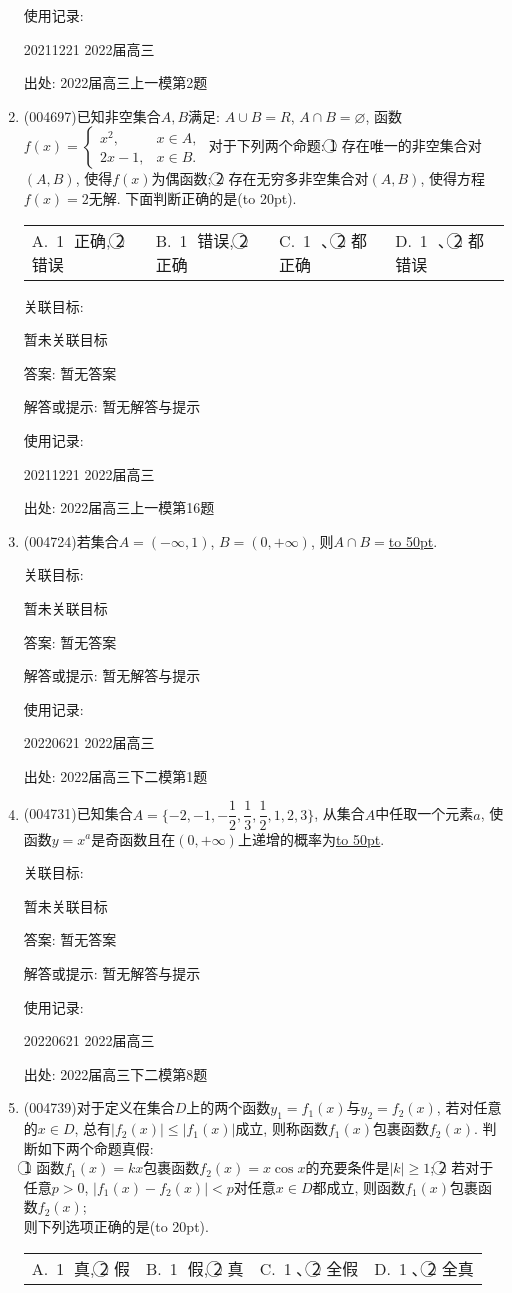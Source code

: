 \documentclass[10pt,a4paper]{article}
\newcommand{\blank}[1]{\underline{\hbox to #1pt{}}}
\newcommand{\bracket}[1]{(\hbox to #1pt{})}
\newcommand{\fourch}[4]{\par\begin{tabular}{p{.23\textwidth}p{.23\textwidth}p{.23\textwidth}p{.23\textwidth}}
A.~#1 &B.~#2& C.~#3& D.~#4
\end{tabular}}
\begin{document}
\begin{enumerate}[1.]
使用记录:

20211221	2022届高三	


出处: 2022届高三上一模第2题
\item { (004697)}已知非空集合$A,B$满足: $A\cup B=R$, $A\cap B=\varnothing$, 函数$f(x)=\begin{cases}
x^2, &  x\in A,  \\ 2x-1, &  x\in B.  \end{cases}$ 对于下列两个命题: \textcircled{1} 存在唯一的非空集合对$(A,B)$, 使得$f(x)$为偶函数; \textcircled{2} 存在无穷多非空集合对$(A,B)$, 使得方程$f(x)=2$无解. 下面判断正确的是\bracket{20}.
\fourch{\textcircled{1} 正确, \textcircled{2} 错误}{\textcircled{1} 错误, \textcircled{2} 正确}{\textcircled{1} 、\textcircled{2} 都正确}{\textcircled{1} 、\textcircled{2} 都错误}


关联目标:

暂未关联目标

答案: 暂无答案

解答或提示: 暂无解答与提示

使用记录:

20211221	2022届高三	


出处: 2022届高三上一模第16题
\item { (004724)}若集合$A=(-\infty ,1)$, $B=(0,+\infty)$, 则$A\cap B=$\blank{50}.


关联目标:

暂未关联目标

答案: 暂无答案

解答或提示: 暂无解答与提示

使用记录:

20220621	2022届高三	


出处: 2022届高三下二模第1题
\item { (004731)}已知集合$A=\{-2,-1,-\dfrac 12,\dfrac 13,\dfrac 12,1,2,3\}$, 从集合$A$中任取一个元素$a$, 使函数$y=x^a$是奇函数且在$(0,+\infty)$上递增的概率为\blank{50}.


关联目标:

暂未关联目标

答案: 暂无答案

解答或提示: 暂无解答与提示

使用记录:

20220621	2022届高三	


出处: 2022届高三下二模第8题
\item { (004739)}对于定义在集合$D$上的两个函数$y_1=f_1(x)$与$y_2=f_2(x)$, 若对任意的$x\in D$, 总有$|f_2(x)|\le |f_1(x)|$成立, 则称函数$f_1(x)$包裹函数$f_2(x)$. 判断如下两个命题真假:\\
\textcircled{1}  函数$f_1(x)=kx$包裹函数$f_2(x)=x\cos x$的充要条件是$|k|\ge 1$;
\textcircled{2}  若对于任意$p>0$, $|f_1(x)-f_2(x)|<p$对任意$x\in D$都成立, 则函数$f_1(x)$包裹函数$f_2(x)$;\\
则下列选项正确的是\bracket{20}.
\fourch{\textcircled{1} 真, \textcircled{2} 假}{\textcircled{1} 假, \textcircled{2} 真}{\textcircled{1}、\textcircled{2} 全假}{\textcircled{1}、\textcircled{2} 全真}



\end{enumerate}
\end{document}
